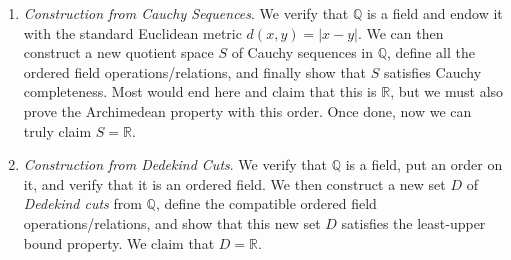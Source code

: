 \begin{enumerate}
  \item \textit{Construction from Cauchy Sequences}. We verify that $\mathbb{Q}$ is a field and endow it with the standard Euclidean metric $d(x, y) = |x - y|$. We can then construct a new quotient space $S$ of Cauchy sequences in $\mathbb{Q}$, define all the ordered field operations/relations, and finally show that $S$ satisfies Cauchy completeness. Most would end here and claim that this is $\mathbb{R}$, but we must also prove the Archimedean property with this order. Once done, now we can truly claim $S = \mathbb{R}$. 

  \item \textit{Construction from Dedekind Cuts}. We verify that $\mathbb{Q}$ is a field, put an order on it, and verify that it is an ordered field. We then construct a new set $D$ of \textit{Dedekind cuts} from $\mathbb{Q}$, define the compatible ordered field operations/relations, and show that this new set $D$ satisfies the least-upper bound property. We claim that $D = \mathbb{R}$. 
\end{enumerate} 


